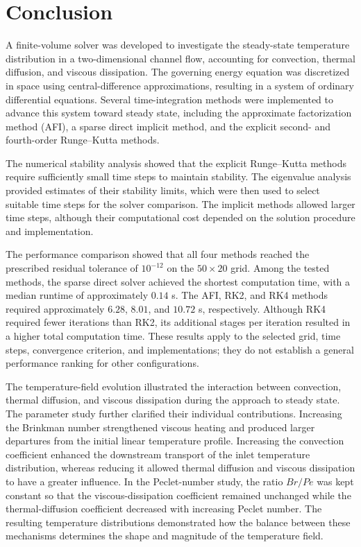 \section{Conclusion}

A finite-volume solver was developed to investigate the steady-state temperature distribution in a two-dimensional channel flow, accounting for convection, thermal diffusion, and viscous dissipation. The governing energy equation was discretized in space using central-difference approximations, resulting in a system of ordinary differential equations. Several time-integration methods were implemented to advance this system toward steady state, including the approximate factorization method (AFI), a sparse direct implicit method, and the explicit second- and fourth-order Runge--Kutta methods.

The numerical stability analysis showed that the explicit Runge--Kutta methods require sufficiently small time steps to maintain stability. The eigenvalue analysis provided estimates of their stability limits, which were then used to select suitable time steps for the solver comparison. The implicit methods allowed larger time steps, although their computational cost depended on the solution procedure and implementation.

The performance comparison showed that all four methods reached the prescribed residual tolerance of $10^{-12}$ on the $50\times20$ grid. Among the tested methods, the sparse direct solver achieved the shortest computation time, with a median runtime of approximately $0.14$ s. The AFI, RK2, and RK4 methods required approximately $6.28$, $8.01$, and $10.72$ s, respectively. Although RK4 required fewer iterations than RK2, its additional stages per iteration resulted in a higher total computation time. These results apply to the selected grid, time steps, convergence criterion, and implementations; they do not establish a general performance ranking for other configurations.

The temperature-field evolution illustrated the interaction between convection, thermal diffusion, and viscous dissipation during the approach to steady state. The parameter study further clarified their individual contributions. Increasing the Brinkman number strengthened viscous heating and produced larger departures from the initial linear temperature profile. Increasing the convection coefficient enhanced the downstream transport of the inlet temperature distribution, whereas reducing it allowed thermal diffusion and viscous dissipation to have a greater influence. In the Peclet-number study, the ratio $Br/Pe$ was kept constant so that the viscous-dissipation coefficient remained unchanged while the thermal-diffusion coefficient decreased with increasing Peclet number. The resulting temperature distributions demonstrated how the balance between these mechanisms determines the shape and magnitude of the temperature field.

